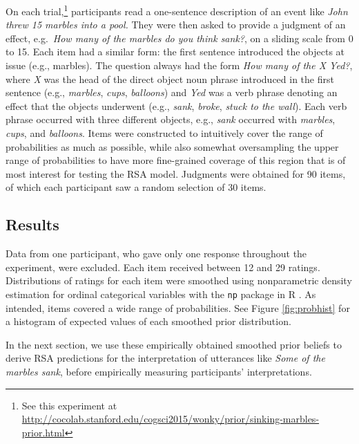 \documentclass[10pt,letterpaper]{article}
\newcommand{\red}[1]{\textcolor{Red}{#1}}
\newcommand{\figref}[1]{Figure \ref{#1}}
\begin{document}
On each trial,\footnote{See this experiment at \scriptsize \url{http://cocolab.stanford.edu/cogsci2015/wonky/prior/sinking-marbles-prior.html}} participants read a one-sentence description of an event like \emph{John threw 15 marbles into a pool.} They were then asked to provide a judgment of an effect, e.g.~\emph{How many of the marbles do you think sank?}, on a sliding scale from 0 to 15. Each item had a similar form: the first sentence introduced the objects at issue (e.g., marbles). The question always had the form \emph{How many of the X Yed?}, where \emph{X} was the head of the direct object noun phrase introduced in the first sentence (e.g., \emph{marbles}, \emph{cups}, \emph{balloons}) and \emph{Yed} was a verb phrase denoting an effect that the objects underwent (e.g., \emph{sank}, \emph{broke}, \emph{stuck to the wall}). Each verb phrase occurred with three different objects, e.g., \emph{sank} occurred with \emph{marbles}, \emph{cups}, and \emph{balloons}. Items were constructed to intuitively cover the range of probabilities as much as possible, while also somewhat oversampling the upper range of probabilities to have more fine-grained coverage of this region that is of most interest for testing the RSA model. Judgments were obtained for 90 items, of which each participant saw a random selection of 30 items. 


\subsection{Results}

Data from one participant, who gave only one response throughout the experiment, were excluded. Each item received between 12 and 29 ratings. Distributions of ratings for each item were smoothed using nonparametric density estimation for ordinal categorical variables \cite{liracine2003} with the \verb|np| package in R \cite{hayfield2008}. As intended, items covered a wide range of probabilities. See \figref{fig:probhist} for a histogram of expected values of each smoothed prior distribution.



In the next section, we use these empirically obtained smoothed prior beliefs to derive RSA predictions for the interpretation of utterances like \emph{Some of the marbles sank}, before empirically measuring participants' interpretations.
\end{document}
